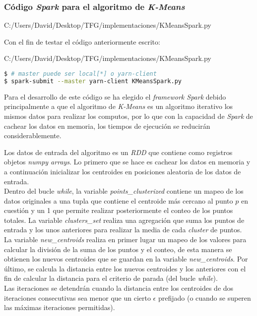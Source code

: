 \newpage

\subsubsection*{Código \textit{Spark} para el algoritmo de \textit{K-Means}}


                {C:/Users/David/Desktop/TFG/implementaciones/KMeansSpark.py}

\clearpage
Con el fin de testar el código anteriormente escrito:


                {C:/Users/David/Desktop/TFG/implementaciones/KMeansSpark.py}

\begin{lstlisting}[language=bash, numbers=none]
$ # master puede ser local[*] o yarn-client
$ spark-submit --master yarn-client KMeansSpark.py
\end{lstlisting}

Para el desarrollo de este código se ha elegido el \textit{framework Spark} debido principalmente a que el algoritmo
de \textit{K-Means} es un algoritmo iterativo los mismos datos para realizar los computos, por lo que con la capacidad
de \textit{Spark} de cachear los datos en memoria, los tiempos de ejecución se reducirán considerablemente.
\newline

Los datos de entrada del algoritmo es un \textit{RDD} que contiene como registros objetos \textit{numpy arrays}.
Lo primero que se hace es cachear los datos en memoria y a continuación inicializar los centroides en posiciones
aleatoria de los datos de entrada.\\
Dentro del bucle \textit{while}, la variable \textit{points\_clusterized} contiene un mapeo de los datos originales
a una tupla que contiene el centroide más cercano al punto $p$ en cuestión y un 1 que permite realizar posteriormente
el conteo de los puntos totales. La variable \textit{clusters\_set} realiza una agregación que suma los puntos de
entrada y los unos anteriores para realizar la media de cada \textit{cluster} de puntos.\\
La variable \textit{new\_centroids} realiza en primer lugar un mapeo de los valores para calcular la división 
de la suma de los puntos y el conteo, de esta manera se obtienen los nuevos centroides que se guardan en la variable
\textit{new\_centroids}. Por último, se calcula la distancia entre los nuevos centroides y los anteriores con el fin
de calcular la distancia para el criterio de parada (del bucle \textit{while}).\\
Las iteraciones se detendrán cuando la distancia entre los centroides de dos iteraciones consecutivas sea menor
que un cierto $\epsilon$ prefijado (o cuando se superen las máximas iteraciones permitidas).
\newline

